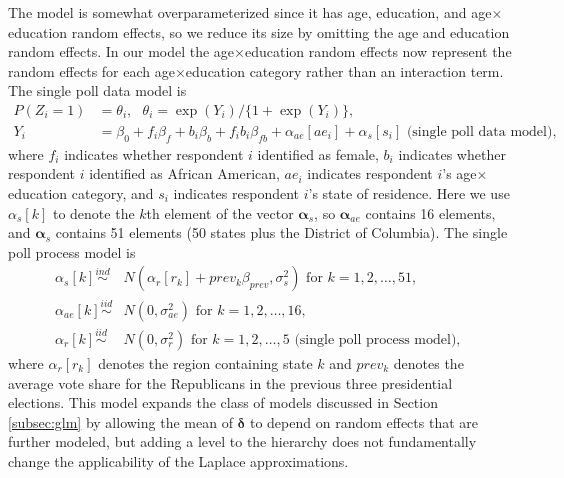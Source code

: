 \documentclass[12pt]{article}
\begin{document}
The model is somewhat overparameterized since it has age, education, and age$\times$education random effects, so we reduce its size by omitting the age and education random effects. In our model the age$\times$education random effects now represent the random effects for each age$\times$education category rather than an interaction term. The single poll data model is
\begin{align*}
P(Z_i = 1) &= \theta_i,\ \ \   \theta_i = \exp(Y_i)/\{1 + \exp(Y_i)\}, \\
Y_i &= \beta_0 + f_i\beta_f + b_i\beta_b + f_ib_i\beta_{fb} + \alpha_{ae}[ae_i] + \alpha_{s}[s_i]\mbox{\ \ \ \ (single poll data model), }
\end{align*}
where $f_i$ indicates whether respondent $i$ identified as female, $b_i$ indicates whether respondent $i$ identified as African American, $ae_i$ indicates respondent $i$'s age$\times$education category, and $s_i$ indicates respondent $i$'s state of residence. Here we use $\alpha_{s}[k]$ to denote the $k$th element of the vector $\bm{\alpha}_s$, so $\bm{\alpha}_{ae}$ contains 16 elements, and $\bm{\alpha}_s$ contains 51 elements (50 states plus the District of Columbia). The single poll process model is
\begin{align*}
\alpha_s[k] \stackrel{ind}{\sim}& N(\alpha_r[r_k] + prev_k\beta_{prev}, \sigma^2_s) \mbox{ for } k=1,2,\dots,51,\\
\alpha_{ae}[k] \stackrel{iid}{\sim}& N(0, \sigma^2_{ae}) \mbox{ for } k=1,2,\dots,16,\\
\alpha_{r}[k] \stackrel{iid}{\sim}& N(0, \sigma^2_{r}) \mbox{ for } k=1,2,\dots,5 \mbox{\ \ \ \ (single poll process model), }
\end{align*}
where $\alpha_r[r_k]$ denotes the region containing state $k$ and $prev_k$ denotes the average vote share for the Republicans in the previous three presidential elections. This model expands the class of models discussed in Section \ref{subsec:glm} by allowing the mean of $\bm{\delta}$ to depend on random effects that are further modeled, but adding a level to the hierarchy does not fundamentally change the applicability of the Laplace approximations.
\end{document}
